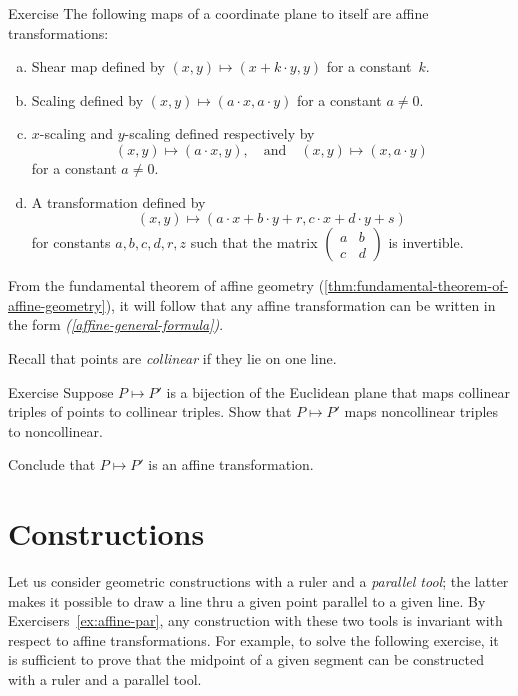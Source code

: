 \begin{thm}{Exercise}\label{ex:afine-linear}
The following maps of a coordinate plane to itself are affine transformations:
\begin{enumerate}[(a)]
\item\label{ex:afine-linear:shear} Shear map defined by $(x,y)\mapsto (x+k\cdot y,y)$ for a constant~$k$.
\item\label{ex:afine-linear:scaling} Scaling defined by $(x,y)\mapsto (a\cdot x,a\cdot y)$ for a constant $a\ne 0$.
\item $x$-scaling and $y$-scaling defined respectively by 
\[(x,y)\mapsto (a\cdot x,y),\quad\text{and}\quad(x,y)\mapsto (x,a\cdot y)\]
for a constant $a\ne 0$.
\item\label{affine-general-formula} A transformation defined by
\[(x,y)\mapsto(a\cdot x+b\cdot y+r,c\cdot x+d\cdot y+s)\]
for constants $a,b,c,d,r,z$ such that the matrix $(\begin{smallmatrix}a&b\\c&d\end{smallmatrix})$ is invertible. 
\end{enumerate}
\end{thm}

From the fundamental theorem of affine geometry (\ref{thm:fundamental-theorem-of-affine-geometry}), it will follow that any affine transformation can be written in the form \textit{(\ref{affine-general-formula})}.

Recall that points are \emph{collinear} if they lie on one line.

\begin{thm}{Exercise}\label{ex:collinear=affine}
Suppose $P\mapsto P'$ is a bijection of the Euclidean plane that maps collinear triples of points to collinear triples.
Show that $P\mapsto P'$ maps noncollinear triples to noncollinear.

Conclude that $P\mapsto P'$ is an affine transformation.
\end{thm}


\section{Constructions}

Let us consider geometric constructions with a ruler and a \emph{parallel tool};
the latter makes it possible to draw a line thru a given point parallel to a given line.
By Exercisers~\ref{ex:affine-par}, any construction with these two tools is invariant with respect to affine transformations.
For example, 
to solve the following exercise,
it is sufficient to prove that the midpoint of a given segment can be constructed with a ruler and a parallel tool.

